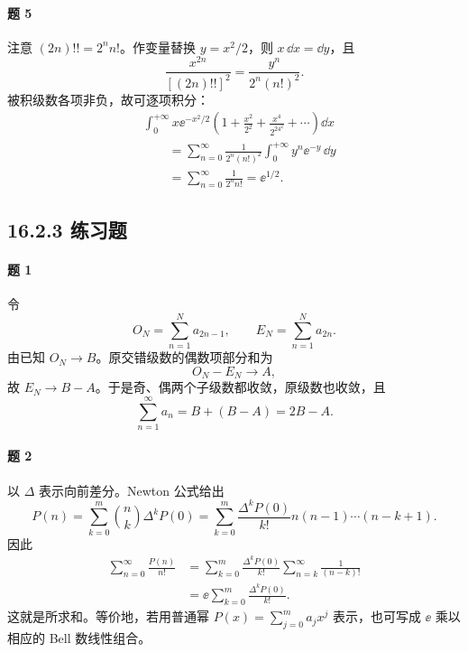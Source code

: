 \paragraph{题 5}
\begin{xsolution}
注意 $(2n)!!=2^nn!$。作变量替换 $y=x^2/2$，则 $x\,\dd x=\dd y$，且
\[
  \frac{x^{2n}}{[(2n)!!]^2}
  =\frac{y^n}{2^n(n!)^2}.
\]
被积级数各项非负，故可逐项积分：
\[
\begin{aligned}
&\int_0^{+\infty}x\ee^{-x^2/2}
  \left(1+\frac{x^2}{2^2}+\frac{x^4}{2^24^2}+\cdots\right)\dd x\\
&\qquad=\sum_{n=0}^{\infty}\frac1{2^n(n!)^2}
  \int_0^{+\infty}y^n\ee^{-y}\,\dd y\\
&\qquad=\sum_{n=0}^{\infty}\frac1{2^nn!}
  =\ee^{1/2}.
\end{aligned}
\]
\end{xsolution}

\subsection*{16.2.3 练习题}

\paragraph{题 1}
\begin{xsolution}
令
\[
  O_N=\sum_{n=1}^Na_{2n-1},\qquad E_N=\sum_{n=1}^Na_{2n}.
\]
由已知 $O_N\to B$。原交错级数的偶数项部分和为
\[
  O_N-E_N\to A,
\]
故 $E_N\to B-A$。于是奇、偶两个子级数都收敛，原级数也收敛，且
\[
  \sum_{n=1}^{\infty}a_n=B+(B-A)=2B-A.
\]
\end{xsolution}

\paragraph{题 2}
\begin{xsolution}
以 $\Delta$ 表示向前差分。Newton 公式给出
\[
  P(n)=\sum_{k=0}^m\binom nk\Delta^kP(0)
  =\sum_{k=0}^m\frac{\Delta^kP(0)}{k!}
    n(n-1)\cdots(n-k+1).
\]
因此
\[
\begin{aligned}
  \sum_{n=0}^{\infty}\frac{P(n)}{n!}
  &=\sum_{k=0}^m\frac{\Delta^kP(0)}{k!}
    \sum_{n=k}^{\infty}\frac1{(n-k)!}\\
  &=\ee\sum_{k=0}^m\frac{\Delta^kP(0)}{k!}.
\end{aligned}
\]
这就是所求和。等价地，若用普通幂 $P(x)=\sum_{j=0}^ma_jx^j$ 表示，也可写成 $\ee$ 乘以相应的 Bell 数线性组合。
\end{xsolution}

